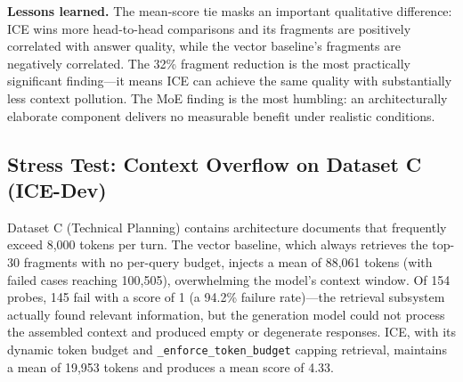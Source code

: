 \documentclass[10pt]{article}
\begin{document}
\textbf{Lessons learned.} The mean-score tie masks an important qualitative difference: ICE wins more head-to-head comparisons and its fragments are positively correlated with answer quality, while the vector baseline's fragments are negatively correlated. The 32\% fragment reduction is the most practically significant finding---it means ICE can achieve the same quality with substantially less context pollution. The MoE finding is the most humbling: an architecturally elaborate component delivers no measurable benefit under realistic conditions.

\subsection{Stress Test: Context Overflow on Dataset C (ICE-Dev)}
\label{sec:stress}

Dataset C (Technical Planning) contains architecture documents that frequently exceed 8{,}000 tokens per turn. The vector baseline, which always retrieves the top-30 fragments with no per-query budget, injects a mean of 88{,}061 tokens (with failed cases reaching 100{,}505), overwhelming the model's context window. Of 154 probes, 145 fail with a score of 1 (a 94.2\% failure rate)---the retrieval subsystem actually found relevant information, but the generation model could not process the assembled context and produced empty or degenerate responses. ICE, with its dynamic token budget and \texttt{\_enforce\_token\_budget} capping retrieval, maintains a mean of 19{,}953 tokens and produces a mean score of 4.33.

\begin{table}[htbp]
\centering
\small
\caption{ICE-Dev stress test (154 probes). The vector baseline collapses to a 94.2\% failure rate on the technical-planning conversation because it has no token-budget cap. ICE survives the same conversation with a mean score of 4.33 and 77\% fewer tokens injected. Note: the vector baseline's 0\% hallucination rate is misleading---94.2\% of its responses are complete failures (score 1), so there is no answer to evaluate for hallucination.}
\label{tab:stress}
\end{table}
\end{document}
